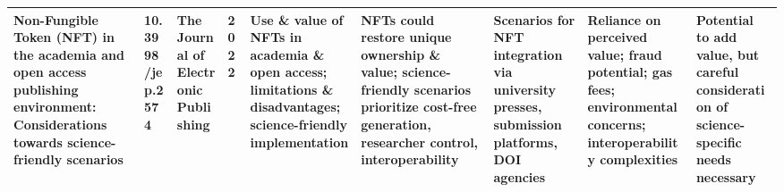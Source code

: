\documentclass[final]{rc-book-2.14}
\begin{document}
\begin{landscape}
\begin{table}[ht]
\begin{tabularx}{\linewidth}{|p{3.5cm}|p{2.5cm}|p{3cm}|p{1.8cm}|X|X|X|X|X|}
            \hline
            Non-Fungible Token (NFT) in the academia and open access publishing environment: Considerations towards science-friendly scenarios & 10.3998/jep.2574              & The Journal of Electronic Publishing                           & 2022                      & Use \& value of NFTs in academia \& open access; limitations \& disadvantages; science-friendly implementation              & NFTs could restore unique ownership \& value; science-friendly scenarios prioritize cost-free generation, researcher control, interoperability & Scenarios for NFT integration via university presses, submission platforms, DOI agencies                & Reliance on perceived value; fraud potential; gas fees; environmental concerns; interoperability complexities                       & Potential to add value, but careful consideration of science-specific needs necessary                 \\
            \hline
        \end{tabularx}
    \end{table}
\end{landscape}
\end{document}

